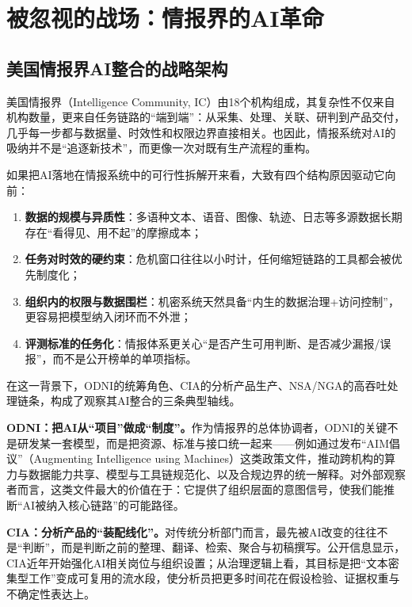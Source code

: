 \section{被忽视的战场：情报界的AI革命}

\subsection{美国情报界AI整合的战略架构}

美国情报界（Intelligence Community, IC）由18个机构组成，其复杂性不仅来自机构数量，更来自任务链路的“端到端”：从采集、处理、关联、研判到产品交付，几乎每一步都与数据量、时效性和权限边界直接相关。也因此，情报系统对AI的吸纳并不是“追逐新技术”，而更像一次对既有生产流程的重构。

如果把AI落地在情报系统中的可行性拆解开来看，大致有四个结构原因驱动它向前：
\begin{enumerate}[label=(\arabic*)]
    \item \textbf{数据的规模与异质性}：多语种文本、语音、图像、轨迹、日志等多源数据长期存在“看得见、用不起”的摩擦成本；
    \item \textbf{任务对时效的硬约束}：危机窗口往往以小时计，任何缩短链路的工具都会被优先制度化；
    \item \textbf{组织内的权限与数据围栏}：机密系统天然具备“内生的数据治理+访问控制”，更容易把模型纳入闭环而不外泄；
    \item \textbf{评测标准的任务化}：情报体系更关心“是否产生可用判断、是否减少漏报/误报”，而不是公开榜单的单项指标。
\end{enumerate}

在这一背景下，ODNI的统筹角色、CIA的分析产品生产、NSA/NGA的高吞吐处理链条，构成了观察其AI整合的三条典型轴线。

            {\bfseries ODNI：把AI从“项目”做成“制度”。}作为情报界的总体协调者，ODNI的关键不是研发某一套模型，而是把资源、标准与接口统一起来——例如通过发布“AIM倡议”（Augmenting Intelligence using Machines）这类政策文件，推动跨机构的算力与数据能力共享、模型与工具链规范化、以及合规边界的统一解释。对外部观察者而言，这类文件最大的价值在于：它提供了组织层面的意图信号，使我们能推断“AI被纳入核心链路”的可能路径。

            {\bfseries CIA：分析产品的“装配线化”。}对传统分析部门而言，最先被AI改变的往往不是“判断”，而是判断之前的整理、翻译、检索、聚合与初稿撰写。公开信息显示，CIA近年开始强化AI相关岗位与组织设置；从治理逻辑上看，其目标是把“文本密集型工作”变成可复用的流水段，使分析员把更多时间花在假设检验、证据权重与不确定性表达上。

